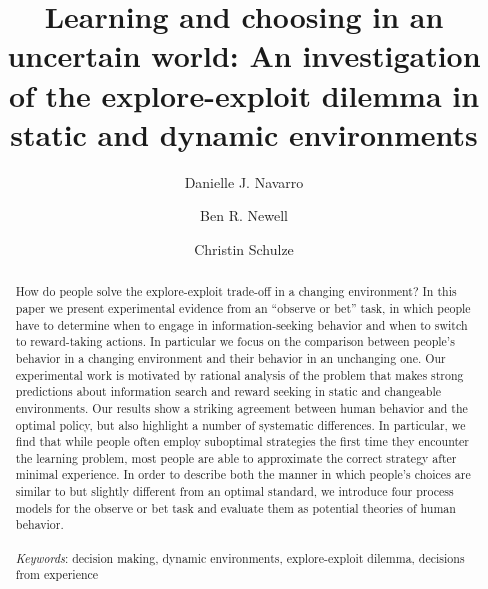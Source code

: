 \documentclass[authoryear]{elsarticle}
\begin{document}
\begin{frontmatter}

\title{Learning and choosing in an uncertain world: An investigation of the explore-exploit dilemma in static and dynamic environments}

\journal{}

\author[adel]{Danielle J. Navarro}

\author[unsw]{Ben R. Newell}

\author[unsw]{Christin Schulze}


\address[adel]{School of Psychology, University of Adelaide, Australia}
\address[unsw]{School of Psychology, University of New South Wales, Australia}



	\begin{abstract}
How do people solve the explore-exploit trade-off in a changing environment? In this paper we present experimental evidence from an ``observe or bet'' task, in which people have to determine when to engage in information-seeking behavior and when to switch to reward-taking actions. In particular we focus on the comparison between people's behavior in a changing environment and their behavior in an unchanging one. Our experimental work is motivated by rational analysis of the problem that makes strong predictions about information search and reward seeking in static and changeable environments. Our results show a striking agreement between human behavior and the optimal policy, but also highlight a number of systematic differences. In particular, we find that while people often employ suboptimal strategies the first time they encounter the learning problem, most people are able to approximate the correct strategy after minimal experience. In order to describe both the manner in which people's choices are similar to but slightly different from an optimal standard, we introduce four process models for the observe or bet task and evaluate them as potential theories of human behavior.\\ \\
	{\it Keywords}: decision making, dynamic environments, explore-exploit dilemma, decisions from experience
	\end{abstract}

\end{frontmatter}
\end{document}
